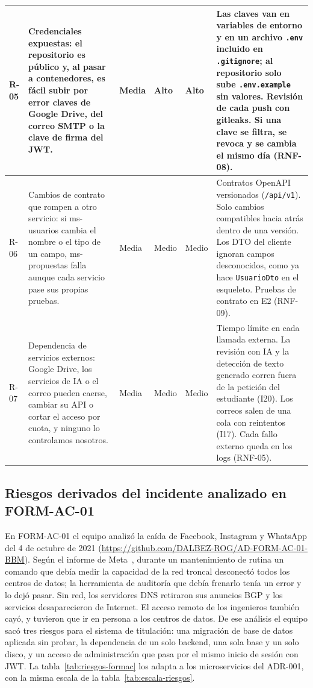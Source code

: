 \begin{longtable}{@{}L{0.9cm}L{4.7cm}L{1.3cm}L{1.3cm}L{1.1cm}L{5.4cm}@{}}
\midrule
R-05 & Credenciales expuestas: el repositorio es público y, al pasar a contenedores, es fácil subir por error claves de Google Drive, del correo SMTP o la clave de firma del JWT. & Media & Alto & Alto & Las claves van en variables de entorno y en un archivo \texttt{.env} incluido en \texttt{.gitignore}; al repositorio solo sube \texttt{.env.example} sin valores. Revisión de cada push con gitleaks. Si una clave se filtra, se revoca y se cambia el mismo día (RNF-08). \\
\midrule
R-06 & Cambios de contrato que rompen a otro servicio: si ms-usuarios cambia el nombre o el tipo de un campo, ms-propuestas falla aunque cada servicio pase sus propias pruebas. & Media & Medio & Medio & Contratos OpenAPI versionados (\texttt{/api/v1}). Solo cambios compatibles hacia atrás dentro de una versión. Los DTO del cliente ignoran campos desconocidos, como ya hace \texttt{UsuarioDto} en el esqueleto. Pruebas de contrato en E2 (RNF-09). \\
\midrule
R-07 & Dependencia de servicios externos: Google Drive, los servicios de IA o el correo pueden caerse, cambiar su API o cortar el acceso por cuota, y ninguno lo controlamos nosotros. & Media & Medio & Medio & Tiempo límite en cada llamada externa. La revisión con IA y la detección de texto generado corren fuera de la petición del estudiante (I20). Los correos salen de una cola con reintentos (I17). Cada fallo externo queda en los logs (RNF-05). \\
\end{longtable}
\endgroup

\subsection*{Riesgos derivados del incidente analizado en FORM-AC-01}

En FORM-AC-01 el equipo analizó la caída de Facebook, Instagram y WhatsApp del 4 de octubre de 2021 (\url{https://github.com/DALBEZ-ROG/AD-FORM-AC-01-BBM}). Según el informe de Meta~\cite{janardhan2021outage}, durante un mantenimiento de rutina un comando que debía medir la capacidad de la red troncal desconectó todos los centros de datos; la herramienta de auditoría que debía frenarlo tenía un error y lo dejó pasar. Sin red, los servidores DNS retiraron sus anuncios BGP y los servicios desaparecieron de Internet. El acceso remoto de los ingenieros también cayó, y tuvieron que ir en persona a los centros de datos. De ese análisis el equipo sacó tres riesgos para el sistema de titulación: una migración de base de datos aplicada sin probar, la dependencia de un solo backend, una sola base y un solo disco, y un acceso de administración que pasa por el mismo inicio de sesión con JWT. La tabla~\ref{tab:riesgos-formac} los adapta a los microservicios del ADR-001, con la misma escala de la tabla~\ref{tab:escala-riesgos}.

